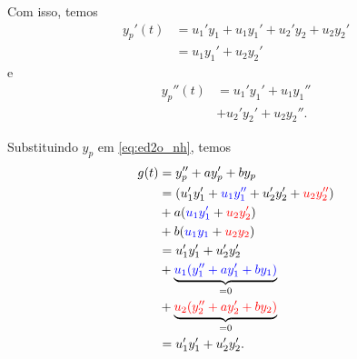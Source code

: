 Com isso, temos
\begin{align}
  y_p'(t) &=  u_1'y_1 + u_1y_1' + u_2'y_2 + u_2y_2' \\
          &= u_1y_1' + u_2y_2'
\end{align}
e
\begin{align}
  y_p''(t) &= u_1'y_1' + u_1y_1'' \\
           &+ u_2'y_2' + u_2y_2''.
\end{align}

Substituindo $y_p$ em \eqref{eq:ed2o_nh}, temos
\begin{align}
  g(t) &= y_p'' + ay_p' + by_p \\
       &= \left(u_1'y_1' + {\color{blue}u_1y_1''} + u_2'y_2' + {\color{red}u_2y_2''} \right) \\
       &+ a({\color{blue}u_1y_1'} + {\color{red}u_2y_2'}) \\
       &+ b({\color{blue}u_1y_1} + {\color{red}u_2y_2}) \\
       &= u_1'y_1' + u_2'y_2' \\
       &+ \underbrace{{\color{blue}u_1(y_1'' + ay_1' + by_1)}}_{=0} \\
       &+ \underbrace{{\color{red}u_2(y_2'' + ay_2' + by_2)}}_{=0} \\
       &= u_1'y_1' + u_2'y_2'. \label{eq:ed2o_nh_mv_2}
\end{align}

